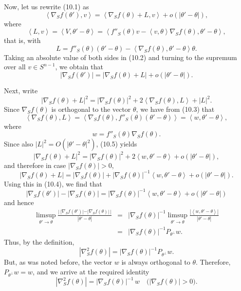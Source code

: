 \documentclass[reqno,12pt]{amsart}
\theoremstyle{plain}
\begin{document}
Now, let us rewrite (10.1) as
\begin{equation}
\left<\nabla_S f(\theta'),v\right> = \left<\nabla_S f(\theta) + L,v\right>
 + o(|\theta' - \theta|),
\end{equation}
where
$$
\left<L,v\right> = \left<V,\theta' - \theta\right> =
\left<f''_S(\theta)v - 
\left<v,\theta\right> \nabla_S f(\theta),\theta' - \theta\right>,
$$
that is, with
\begin{equation}
L = f''_S(\theta)(\theta' - \theta) - 
\left<\nabla_S f(\theta),\theta' - \theta\right>\theta.
\end{equation}
Taking an absolute value of both sides in (10.2) and turning to the 
supremum over all $v \in S^{n-1}$, we obtain that
\begin{equation}
|\nabla_S f(\theta')| = |\nabla_S f(\theta) + L| + 
o(|\theta' - \theta|).
\end{equation}

Next, write
\begin{equation}
|\nabla_S f(\theta) + L|^2 =
|\nabla_S f(\theta)|^2 + 2\left<\nabla_S f(\theta),L\right> + |L|^2.
\end{equation}
Since $\nabla_S f(\theta)$ is orthogonal to the vector $\theta$, 
we have from (10.3) that
$$
\left<\nabla_S f(\theta),L\right> = 
\left<\nabla_S f(\theta),f''_S(\theta)(\theta' - \theta)\right> =
\left<w,\theta' - \theta\right>,
$$
where 
$$
w = f''_S(\theta)\nabla_S f(\theta).
$$
Since also $|L|^2 = O(|\theta' - \theta|^2)$, (10.5) yields
$$
|\nabla_S f(\theta) + L|^2 =
|\nabla_S f(\theta)|^2 + 2\left<w,\theta' - \theta\right> + 
o(|\theta' - \theta|),
$$
and therefore in case $|\nabla_S f(\theta)|>0$,
$$
|\nabla_S f(\theta) + L| =
|\nabla_S f(\theta)| + |\nabla_S f(\theta)|^{-1}
\left<w,\theta' - \theta\right> + o(|\theta' - \theta|).
$$
Using this in (10.4), we find that
$$
|\nabla_S f(\theta')| - |\nabla_S f(\theta)| = 
|\nabla_S f(\theta)|^{-1}
\left<w,\theta' - \theta\right> + o(|\theta' - \theta|)
$$
and hence
\begin{eqnarray*}
\limsup_{\theta' \rightarrow \theta} 
\frac{|\,|\nabla_S f(\theta')|-|\nabla_S f(\theta)|\,|}{|\theta' - \theta|}
 & = &
|\nabla_S f(\theta)|^{-1}
\limsup_{\theta' \rightarrow \theta} 
\frac{|\left<w,\theta' - \theta\right>|}{|\theta' - \theta|} \\
 & = &
|\nabla_S f(\theta)|^{-1} P_{\theta^\perp} w.
\end{eqnarray*}
Thus, by the definition, 
$$
|\nabla_S^2 f(\theta)| = |\nabla_S f(\theta)|^{-1} P_{\theta^\perp} w.
$$
But, as was noted before, the vector $w$ is always orthogonal to $\theta$. 
Therefore, $P_{\theta^\perp} w = w$, and we arrive at the required identity
$$
|\nabla_S^2 f(\theta)| = |\nabla_S f(\theta)|^{-1}\, w \quad
\big(|\nabla_S f(\theta)|>0\big).
$$
\end{document}
